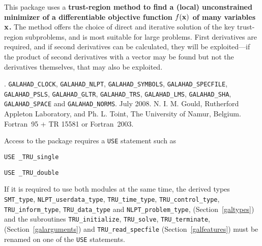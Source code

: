 \documentclass{galahad}
\newcommand{\packagename}{TRU}
\newcommand{\fullpackagename}{\libraryname\_\packagename}
\begin{document}
\galheader


\galsummary
This package uses a {\bf trust-region method to find a (local)
unconstrained minimizer of a differentiable objective function $f({\mathbf{x}})$
of many variables ${\mathbf{x}}$.} The method offers the choice of direct
and iterative solution of the key trust-region subproblems, and
is most suitable for large problems. First derivatives are required,
and if second derivatives can be calculated, they will be exploited---if
the product of second derivatives with a vector may be found but
not the derivatives themselves, that may also be exploited.


\galattributes
\galversions{\tt  \fullpackagename\_single, \fullpackagename\_double}.
\galuses
{\tt GALAHAD\_CLOCK},
{\tt GALAHAD\_NLPT},
{\tt GALAHAD\_SY\-M\-BOLS},
{\tt GALAHAD\_SPECFILE},
{\tt GALAHAD\_PSLS},
{\tt GALAHAD\_GLTR},
{\tt GALAHAD\_TRS},
{\tt GALAHAD\_LMS},
{\tt GALAHAD\_SHA},
{\tt GALAHAD\_SPACE} and
{\tt GALAHAD\_NORMS}.
\galdate July 2008.
\galorigin N. I. M. Gould, Rutherford Appleton Laboratory,
and Ph. L. Toint, The University of Namur, Belgium.
\gallanguage Fortran~95 + TR 15581 or Fortran~2003.


\galhowto


Access to the package requires a {\tt USE} statement such as

\medskip{}

\hspace{8mm} {\tt USE \fullpackagename\_single}

\medskip{}

\hspace{8mm} {\tt USE  \fullpackagename\_double}

\medskip

\noindent
If it is required to use both modules at the same time, the derived types
{\tt SMT\_type},
{\tt NLPT\_userdata\_type},
{\tt \packagename\_time\_\-type},
{\tt \packagename\_control\_type},
{\tt \packagename\_inform\_type},
{\tt \packagename\_data\_type}
and
{\tt NLPT\_problem\_type},
(Section~\ref{galtypes})
and the subroutines
{\tt \packagename\_initialize},
{\tt \packagename\_\-solve},
{\tt \packagename\_terminate},
(Section~\ref{galarguments})
and
{\tt \packagename\_read\_specfile}
(Section~\ref{galfeatures})
must be renamed on one of the {\tt USE} statements.
\end{document}
